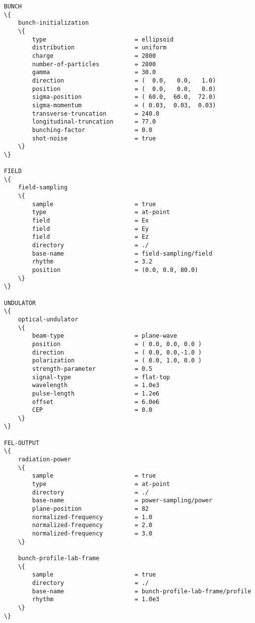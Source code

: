\begin{appendices}
\begin{snugshade}
\begin{Verbatim}[fontsize=\footnotesize, tabsize=4, fontfamily=courier, fontseries=b, commandchars=\\\{\}, obeytabs]
BUNCH
\{
	bunch-initialization
	\{
		type						 = ellipsoid
		distribution				 = uniform
		charge						 = 2800
		number-of-particles			 = 2800
		gamma						 = 30.0
		direction					 = (  0.0,   0.0,   1.0)
		position					 = (  0.0,   0.0,   0.0)
		sigma-position				 = ( 60.0,  60.0,  72.0)
		sigma-momentum				 = ( 0.03,  0.03,  0.03)
		transverse-truncation		 = 240.0
		longitudinal-truncation		 = 77.0
		bunching-factor				 = 0.0
		shot-noise					 = true
	\}
\}

FIELD
\{
	field-sampling
	\{
		sample                       = true
		type                         = at-point
		field                        = Ex
		field                        = Ey
		field                        = Ez
		directory                    = ./
		base-name                    = field-sampling/field
		rhythm                       = 3.2
		position                     = (0.0, 0.0, 80.0)
	\}
\}

UNDULATOR
\{
	optical-undulator
	\{
		beam-type                    = plane-wave
		position                     = ( 0.0, 0.0, 0.0 )
		direction                    = ( 0.0, 0.0,-1.0 )
		polarization                 = ( 0.0, 1.0, 0.0 )
		strength-parameter           = 0.5
		signal-type                  = flat-top
		wavelength                   = 1.0e3
		pulse-length                 = 1.2e6
		offset 						 = 6.0e6
		CEP                          = 0.0
	\}
\}

FEL-OUTPUT
\{
	radiation-power
	\{
		sample                       = true
		type                         = at-point
		directory                    = ./
		base-name                    = power-sampling/power
		plane-position            	 = 82
		normalized-frequency         = 1.0
		normalized-frequency         = 2.0
		normalized-frequency         = 3.0
	\}
	
	bunch-profile-lab-frame
	\{
		sample						 = true
		directory					 = ./
		base-name					 = bunch-profile-lab-frame/profile
		rhythm						 = 1.0e3
	\}
\}
\end{Verbatim}
\end{snugshade}

\end{appendices}